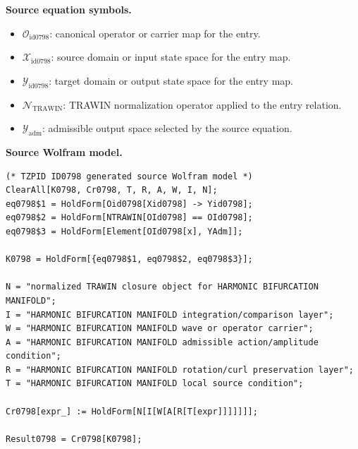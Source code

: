 \begin{minipage}[t]{0.49\linewidth}
\begingroup
\small
\raggedright
\textbf{Source equation symbols.}\par
\begin{itemize}[leftmargin=1.35em,itemsep=1pt,topsep=1pt,parsep=0pt]
    \item $\mathcal{O}_{\mathrm{id0798}}$: canonical operator or carrier map for the entry.
    \item $\mathcal{X}_{\mathrm{id0798}}$: source domain or input state space for the entry map.
    \item $\mathcal{Y}_{\mathrm{id0798}}$: target domain or output state space for the entry map.
    \item $\mathcal{N}_{\mathrm{TRAWIN}}$: TRAWIN normalization operator applied to the entry relation.
    \item $\mathcal{Y}_{\mathrm{adm}}$: admissible output space selected by the source equation.
\end{itemize}
\endgroup
\end{minipage}\hfill
\begin{minipage}[t]{0.47\linewidth}
\begingroup
\scriptsize
\raggedright
\textbf{Source Wolfram model.}\par
\begin{Verbatim}[fontsize=\tiny,breaklines=true,breakanywhere=true]
(* TZPID ID0798 generated source Wolfram model *)
ClearAll[K0798, Cr0798, T, R, A, W, I, N];
eq0798$1 = HoldForm[Oid0798[Xid0798] -> Yid0798];
eq0798$2 = HoldForm[NTRAWIN[OId0798] == OId0798];
eq0798$3 = HoldForm[Element[OId0798[x], YAdm]];

K0798 = HoldForm[{eq0798$1, eq0798$2, eq0798$3}];

N = "normalized TRAWIN closure object for HARMONIC BIFURCATION MANIFOLD";
I = "HARMONIC BIFURCATION MANIFOLD integration/comparison layer";
W = "HARMONIC BIFURCATION MANIFOLD wave or operator carrier";
A = "HARMONIC BIFURCATION MANIFOLD admissible action/amplitude condition";
R = "HARMONIC BIFURCATION MANIFOLD rotation/curl preservation layer";
T = "HARMONIC BIFURCATION MANIFOLD local source condition";

Cr0798[expr_] := HoldForm[N[I[W[A[R[T[expr]]]]]]];

Result0798 = Cr0798[K0798];
\end{Verbatim}
\endgroup
\end{minipage}


